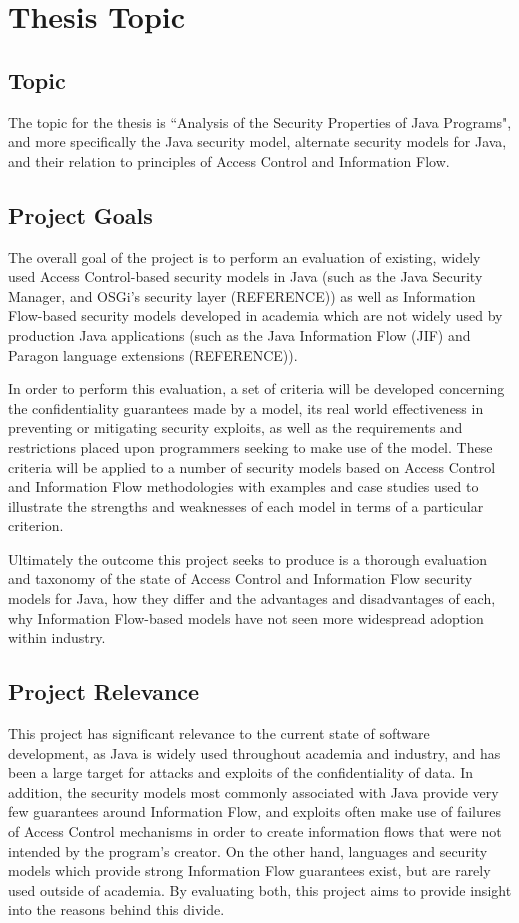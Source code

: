 \section{Thesis Topic}

\subsection{Topic}

The topic for the thesis is ``Analysis of the Security Properties of Java Programs", and more specifically the Java security model, alternate security models for Java, and their relation to principles of Access Control and Information Flow. 

\subsection{Project Goals}

The overall goal of the project is to perform an evaluation of existing, widely used Access Control-based security models in Java (such as the Java Security Manager, and OSGi's security layer (REFERENCE)) as well as Information Flow-based security models developed in academia which are not widely used by production Java applications (such as the Java Information Flow (JIF) and Paragon language extensions (REFERENCE)).

In order to perform this evaluation, a set of criteria will be developed concerning the confidentiality guarantees made by a model, its real world effectiveness in preventing or mitigating security exploits, as well as the requirements and restrictions placed upon programmers seeking to make use of the model. These criteria will be applied to a number of security models based on Access Control and Information Flow methodologies with examples and case studies used to illustrate the strengths and weaknesses of each model in terms of a particular criterion.

Ultimately the outcome this project seeks to produce is a thorough evaluation and taxonomy of the state of Access Control and Information Flow security models for Java, how they differ and the advantages and disadvantages of each, why Information Flow-based models have not seen more widespread adoption within industry.

\subsection{Project Relevance}

This project has significant relevance to the current state of software development, as Java is widely used throughout academia and industry, and has been a large target for attacks and exploits of the confidentiality of data. In addition, the security models most commonly associated with Java provide very few guarantees around Information Flow, and exploits often make use of failures of Access Control mechanisms in order to create information flows that were not intended by the program's creator. On the other hand, languages and security models which provide strong Information Flow guarantees exist, but are rarely used outside of academia. By evaluating both, this project aims to provide insight into the reasons behind this divide.